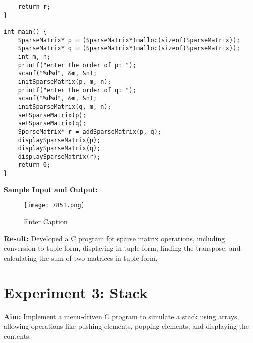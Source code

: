 \documentclass{article}
\begin{document}
\begin{lstlisting}
    return r;
}

int main() {
    SparseMatrix* p = (SparseMatrix*)malloc(sizeof(SparseMatrix));
    SparseMatrix* q = (SparseMatrix*)malloc(sizeof(SparseMatrix));
    int m, n;
    printf("enter the order of p: ");
    scanf("%d%d", &m, &n);
    initSparseMatrix(p, m, n);
    printf("enter the order of q: ");
    scanf("%d%d", &m, &n);
    initSparseMatrix(q, m, n);
    setSparseMatrix(p);
    setSparseMatrix(q);
    SparseMatrix* r = addSparseMatrix(p, q);
    displaySparseMatrix(p);
    displaySparseMatrix(q);
    displaySparseMatrix(r);
    return 0;
}
\end{lstlisting}

\textbf{Sample Input and Output:}
\begin{figure}[h]
    \centering
    \texttt{[image: 7851.png]}
    \caption{Enter Caption}
    \label{fig:enter-label}
\end{figure}

\textbf{Result:} Developed a C program for sparse matrix operations, including conversion to tuple form, displaying in tuple form, finding the transpose, and calculating the sum of two matrices in tuple form.

\clearpage
\section{Experiment 3: Stack}
\textbf{Aim:}  Implement a menu-driven C program to simulate a stack using arrays, allowing operations like pushing elements, popping elements, and displaying the contents.
\end{document}
